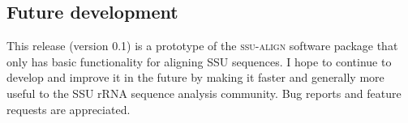 \subsection{Future development}

This release (version 0.1) is a prototype of the \textsc{ssu-align}
software package that only has basic functionality for aligning SSU
sequences. I hope to continue to develop and improve it in the future
by making it faster and generally more useful to the SSU rRNA sequence
analysis community. Bug reports and feature requests are appreciated.
